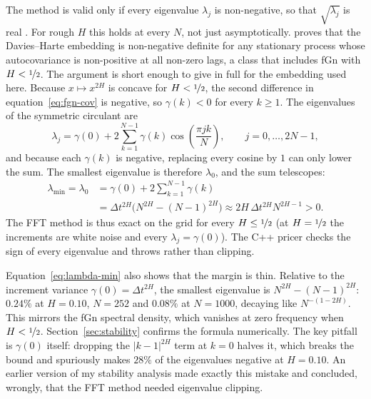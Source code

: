 The method is valid only if every eigenvalue $\lambda_j$ is non-negative, so that
$\sqrt{\lambda_j}$ is real \citep{wood1994simulation}.  For rough $H$ this holds at
every $N$, not just asymptotically.  \citet{craigmile2003simulating} proves that the
Davies--Harte embedding is non-negative definite for any stationary process whose
autocovariance is non-positive at all non-zero lags, a class that includes fGn with
$H < \nicefrac{1}{2}$.  The argument is short enough to give in full for the
embedding used here.  Because $x \mapsto x^{2H}$ is concave for $H < \nicefrac{1}{2}$,
the second difference in equation~\eqref{eq:fgn-cov} is negative, so $\gamma(k) < 0$
for every $k \geq 1$.  The eigenvalues of the symmetric circulant are
\begin{equation}
  \lambda_j = \gamma(0) + 2\sum_{k=1}^{N-1} \gamma(k)\cos\!\left(\frac{\pi jk}{N}\right),
  \qquad j = 0, \ldots, 2N-1,
\end{equation}
and because each $\gamma(k)$ is negative, replacing every cosine by $1$ can only lower
the sum.  The smallest eigenvalue is therefore $\lambda_0$, and the sum telescopes:
\begin{equation}
  \label{eq:lambda-min}
  \begin{split}
  \lambda_{\min} = \lambda_0
    &= \gamma(0) + 2\sum_{k=1}^{N-1}\gamma(k) \\
    &= \Delta t^{2H}\bigl(N^{2H} - (N-1)^{2H}\bigr)
     \approx 2H\,\Delta t^{2H} N^{2H-1} > 0.
  \end{split}
\end{equation}
The FFT method is thus exact on the grid for every $H \leq \nicefrac{1}{2}$ (at
$H = \nicefrac{1}{2}$ the increments are white noise and every $\lambda_j = \gamma(0)$).
The C++ pricer checks the sign of every eigenvalue and throws rather than clipping.

Equation~\eqref{eq:lambda-min} also shows that the margin is thin.  Relative to the
increment variance $\gamma(0) = \Delta t^{2H}$, the smallest eigenvalue is
$N^{2H} - (N-1)^{2H}$: $0.24\%$ at $H = 0.10$, $N = 252$ and $0.08\%$ at $N = 1000$,
decaying like $N^{-(1-2H)}$.  This mirrors the fGn spectral density, which vanishes
at zero frequency when $H < \nicefrac{1}{2}$.  Section~\ref{sec:stability} confirms
the formula numerically.  The key pitfall is $\gamma(0)$ itself: dropping the
$|k-1|^{2H}$ term at $k = 0$ halves it, which breaks the bound and spuriously makes
$28\%$ of the eigenvalues negative at $H = 0.10$.  An earlier version of my
stability analysis made exactly this mistake and concluded, wrongly, that the FFT
method needed eigenvalue clipping.

